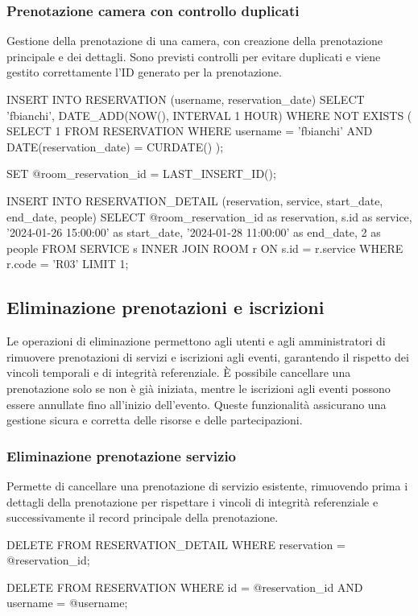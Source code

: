 \documentclass[a4paper,12pt]{report}
\begin{document}
\newpage
\subsubsection{Prenotazione camera con controllo duplicati}
Gestione della prenotazione di una camera, con creazione della
prenotazione principale e dei dettagli. Sono previsti controlli per
evitare duplicati e viene gestito correttamente l'ID generato per la
prenotazione.

\begin{sqlcode}[caption={}]
INSERT INTO RESERVATION (username, reservation_date)
SELECT 'fbianchi', DATE_ADD(NOW(), INTERVAL 1 HOUR)
WHERE NOT EXISTS (
  SELECT 1 FROM RESERVATION
  WHERE username = 'fbianchi'
  AND DATE(reservation_date) = CURDATE()
);

SET @room_reservation_id = LAST_INSERT_ID();

INSERT INTO RESERVATION_DETAIL (reservation, service, start_date, end_date, people)
SELECT
  @room_reservation_id as reservation,
  s.id as service,
  '2024-01-26 15:00:00' as start_date,
  '2024-01-28 11:00:00' as end_date,
  2 as people
FROM SERVICE s
INNER JOIN ROOM r ON s.id = r.service
WHERE r.code = 'R03'
LIMIT 1;
\end{sqlcode}

\newpage
\subsection{Eliminazione prenotazioni e iscrizioni}
Le operazioni di eliminazione permettono agli utenti e agli
amministratori di rimuovere prenotazioni di servizi e iscrizioni agli
eventi, garantendo il rispetto dei vincoli temporali e di integrità
referenziale. È possibile cancellare una prenotazione solo se non è
già iniziata, mentre le iscrizioni agli eventi possono essere
annullate fino all'inizio dell'evento. Queste funzionalità assicurano
una gestione sicura e corretta delle risorse e delle partecipazioni.

\subsubsection{Eliminazione prenotazione servizio}
Permette di cancellare una prenotazione di servizio esistente,
rimuovendo prima i dettagli della prenotazione per rispettare i
vincoli di integrità referenziale e successivamente il record
principale della prenotazione.

\begin{sqlcode}[caption={}]
DELETE FROM RESERVATION_DETAIL
WHERE reservation = @reservation_id;

DELETE FROM RESERVATION
WHERE id = @reservation_id
AND username = @username;
\end{sqlcode}
\end{document}
